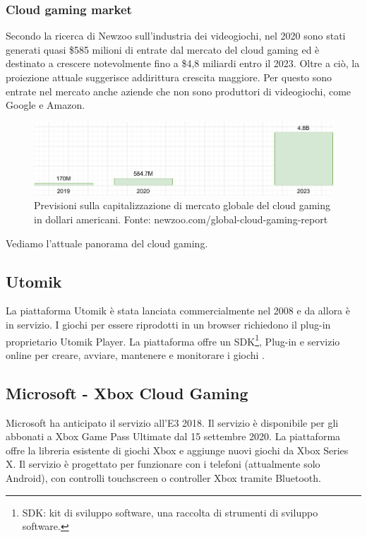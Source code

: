 \subsubsection{Cloud gaming market}
Secondo la ricerca di Newzoo sull'industria dei videogiochi, nel 2020 sono stati generati quasi \$585 milioni di entrate dal mercato del cloud gaming ed è destinato a crescere notevolmente fino a \$4,8 miliardi entro il 2023. Oltre a ciò, la proiezione attuale suggerisce addirittura crescita maggiore. Per questo sono entrate nel mercato anche aziende che non sono produttori di videogiochi, come Google e Amazon.

\begin{figure}[H]
	\includegraphics[width=\linewidth]{immagini/Newzoo_Cloud_Gaming_Revenues}
	\caption{Previsioni sulla capitalizzazione di mercato globale del cloud gaming in dollari americani. Fonte: newzoo.com/global-cloud-gaming-report}
	\label{fig:Newzoo_Cloud_Gaming_Revenues_Sept_2020}
\end{figure}

Vediamo l'attuale panorama del cloud gaming.

\subsection{Utomik}
La piattaforma Utomik è stata lanciata commercialmente nel 2008 e da allora è in servizio. I giochi per essere riprodotti in un browser richiedono il plug-in proprietario Utomik Player. La piattaforma offre un SDK\footnote{SDK: kit di sviluppo software, una raccolta di strumenti di sviluppo software.}, Plug-in e servizio online per creare, avviare, mantenere e monitorare i giochi \cite{Utomik}.

\subsection{Microsoft - Xbox Cloud Gaming}
Microsoft ha anticipato il servizio all'E3 2018. Il servizio è disponibile per gli abbonati a Xbox Game Pass Ultimate dal 15 settembre 2020. La piattaforma offre la libreria esistente di giochi Xbox e aggiunge nuovi giochi da Xbox Series X. Il servizio è progettato per funzionare con i telefoni (attualmente solo Android), con controlli touchscreen o controller Xbox tramite Bluetooth\cite{Xbox_Game_Pass_cloud_gaming}.

